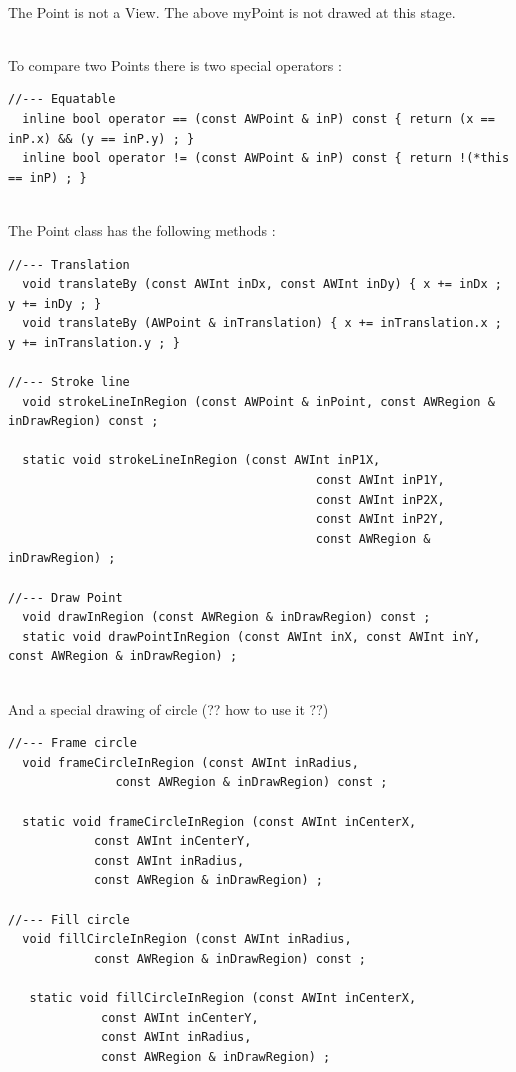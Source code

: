 \documentclass[a4paper,11pt]{extarticle}
\begin{document}
~\\ The Point is not a View. The above myPoint is not drawed at this stage.

~\\ To compare two Points there is two special operators :
\begin{lstlisting}[language=Arduinonl]
//--- Equatable
  inline bool operator == (const AWPoint & inP) const { return (x == inP.x) && (y == inP.y) ; }
  inline bool operator != (const AWPoint & inP) const { return !(*this == inP) ; }
\end{lstlisting}

~\\ The Point class has the following methods :

\begin{lstlisting}[language=Arduinonl]
//--- Translation
  void translateBy (const AWInt inDx, const AWInt inDy) { x += inDx ; y += inDy ; }
  void translateBy (AWPoint & inTranslation) { x += inTranslation.x ; y += inTranslation.y ; }

//--- Stroke line
  void strokeLineInRegion (const AWPoint & inPoint, const AWRegion & inDrawRegion) const ;

  static void strokeLineInRegion (const AWInt inP1X,
                                           const AWInt inP1Y,
                                           const AWInt inP2X,
                                           const AWInt inP2Y,
                                           const AWRegion & inDrawRegion) ;

//--- Draw Point
  void drawInRegion (const AWRegion & inDrawRegion) const ;
  static void drawPointInRegion (const AWInt inX, const AWInt inY, const AWRegion & inDrawRegion) ;
\end{lstlisting}

~\\ And a special drawing of circle (?? how to use it ??)

\begin{lstlisting}[language=Arduinonl]
//--- Frame circle
  void frameCircleInRegion (const AWInt inRadius,
               const AWRegion & inDrawRegion) const ;

  static void frameCircleInRegion (const AWInt inCenterX,
            const AWInt inCenterY,
            const AWInt inRadius,
            const AWRegion & inDrawRegion) ;

//--- Fill circle
  void fillCircleInRegion (const AWInt inRadius,
            const AWRegion & inDrawRegion) const ;

   static void fillCircleInRegion (const AWInt inCenterX,
             const AWInt inCenterY,
             const AWInt inRadius,
             const AWRegion & inDrawRegion) ;
\end{lstlisting}
\end{document}

